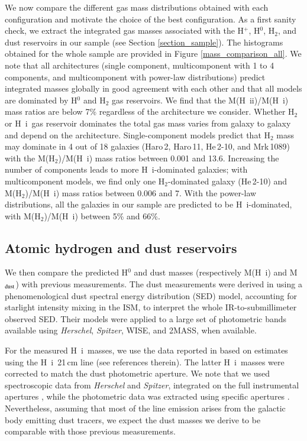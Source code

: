 \documentclass{aa}
\newcommand{\hi}{H~{\sc i}}
\newcommand{\hii}{H~{\sc ii}}
\begin{document}
We now compare the different gas mass distributions obtained with each configuration and motivate the choice of the best configuration. As a first sanity check, we extract the integrated gas masses associated with the H$^+$, H$^0$, H$_2$, and dust reservoirs in our sample (see Section \ref{section_sample}). The histograms obtained for the whole sample are provided in Figure \ref{mass_comparison_all}. We note that all architectures (single component, multicomponent with 1 to 4 components, and multicomponent with power-law distributions) predict integrated masses globally in good agreement with each other and that all models are dominated by H$^0$ and H$_2$ gas reservoirs. We find that the M(\hii)/M(\hi) mass ratios are below 7\% regardless of the architecture we consider. Whether H$_2$ or \hi\ gas reservoir dominates the total gas mass varies from galaxy to galaxy and depend on the architecture. Single-component models predict that H$_2$ mass may dominate in 4 out of 18 galaxies (Haro\,2, Haro\,11, He\,2-10, and Mrk\,1089) with the M(H$_2$)/M(\hi) mass ratios between 0.001 and 13.6. Increasing the number of components leads to more \hi-dominated galaxies; with multicomponent models, we find only one H$_2$-dominated galaxy (He\,2-10) and M(H$_2$)/M(\hi) mass ratios between 0.006 and 7. With the power-law distributions, all the galaxies in our sample are predicted to be \hi-dominated, with M(H$_2$)/M(\hi) between 5\% and 66\%.

\subsection{Atomic hydrogen and dust reservoirs}
\label{subsect_masses}

We then compare the predicted H$^0$ and dust masses (respectively M(\hi) and M$_{\rm dust}$) with previous measurements. The dust measurements were derived in \cite{remy-ruyer_linking_2015} using a phenomenological dust spectral energy distribution (SED) model, accounting for starlight intensity mixing in the ISM, to interpret the whole IR-to-submillimeter observed SED. Their models were applied to a large set of photometric bands available using \textit{Herschel}, \textit{Spitzer}, WISE, and 2MASS, when available. 

For the measured \hi\ masses, we use the data reported in \cite{remy-ruyer_gas--dust_2014} based on estimates using the \hi\ 21\,cm line (see references therein). The latter \hi\ masses were corrected to match the dust photometric aperture. We note that we used spectroscopic data from \textit{Herschel} and \textit{Spitzer}, integrated on the full instrumental apertures \citep{Cormier_2015}, while the photometric data was extracted using specific apertures \citep[see][]{Remy-Ruyer_2013}. Nevertheless, assuming that most of the line emission arises from the galactic body emitting dust tracers, we expect the dust masses we derive to be comparable with those previous measurements.
\end{document}
